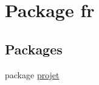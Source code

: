 \hypertarget{namespacefr}{}\section{Package fr}
\label{namespacefr}
\subsection*{Packages}
\begin{DoxyCompactItemize}
\item 
package \hyperlink{namespacefr_1_1projet}{projet}
\end{DoxyCompactItemize}

